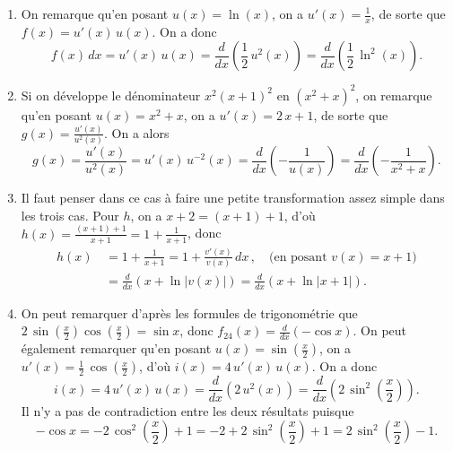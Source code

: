 \begin{enumerate}
\item On remarque qu'en posant $u(x)= \ln (x)$, on a $u'(x)=\frac{1}{x}$, de sorte que
$f(x)=u'(x)\,u(x)$. On a donc 
\[
 f(x)\,dx= u'(x)\,u(x)=
 \frac{d}{dx} \left(\frac{1}{2}\, u^{2}(x)\right)=
\frac{d}{dx} \left( \frac{1}{2}\, \ln^{2}(x)\right).
\]
\item Si on développe le
dénominateur $x^2(x+1)^2$ en $(x^2+x)^2$, on remarque qu'en posant $u(x)=x^2+x$, on a $u'(x)=2\,x+1$, de sorte
que $g(x)=\frac{u'(x)}{u^{2}(x)}$. On a alors 
\[
g(x)= \frac{u'(x)}{u^{2}(x)}= 
u'(x)\, u^{-2}(x)=\frac{d}{dx} \left(-\frac{1}{u(x)}\right)=\frac{d}{dx} \left(-\frac{1}{x^2+x}\right).
\] 
\item Il faut penser dans ce cas à faire une petite
transformation assez simple dans les trois cas. Pour $h$, on a $
x+2=(x+1)+1$, d'où $h(x)=\frac{(x+1)+1}{x+1}=1+\frac{1}{x+1}$,
donc
\begin{align*}
h(x)\, &=  1+\frac{1}{x+1}=1+ \frac{v'(x)}{v(x)}\,dx\,,\quad \text{(en posant $v(x)=x+1$)}\\
&= \frac{d}{dx} \left(x+\ln |v(x)|\right)= \frac{d}{dx}\left(x+\ln |x+1|\right).
\end{align*}
\item On peut remarquer d'après les formules de trigonométrie que $2\,\sin(\frac{x}{2})\cos(\frac{x}{2})=\sin x$, donc
$ f_{24}(x) =  \frac{d}{dx}\left(-\cos x \right)$. On peut également remarquer qu'en posant
 $u(x)=\sin(\frac{x}{2})$, on a $u'(x)=\frac{1}{2}\, \cos(\frac{x}{2})$,
d'où $i(x)=4\,u'(x)\, u(x)$. On a donc
\[
i (x)= 4\,  u'(x)\, u(x)= \frac{d}{dx}\left( 2\,u^2(x)\right)= \frac{d}{dx}\left(2\,\sin^{2}\left(\frac{x}{2}\right)\right).
\]
Il n'y a pas de contradiction entre les deux résultats puisque
\[
-\cos x = -2\, \cos^{2}\left(\frac{x}{2}\right)+1
= -2+2\,\sin^2\left(\frac{x}{2}\right)+1
=2\,\sin^{2}\left(\frac{x}{2}\right)-1.
\]
\end{enumerate}